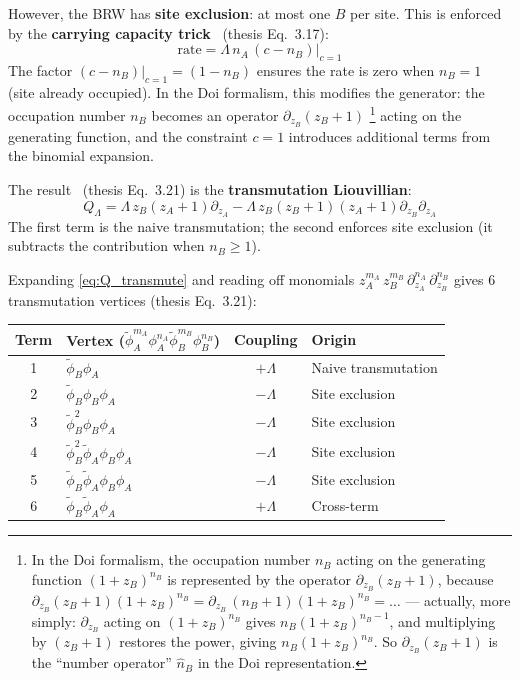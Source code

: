 \documentclass[11pt,a4paper]{article}
\theoremstyle{definition}
\newcommand{\phit}{\tilde{\phi}}
\begin{document}
However, the BRW has \textbf{site exclusion}: at most one $B$ per site.
This is enforced by the \textbf{carrying capacity
trick}~\cite{amarteifio2019} (thesis Eq.~3.17):
\begin{equation}
\text{rate} = \Lambda\, n_A\,(c - n_B)\big|_{c=1}
\label{eq:carrying_capacity}
\end{equation}
The factor $(c - n_B)|_{c=1} = (1 - n_B)$ ensures the rate is zero when
$n_B = 1$ (site already occupied). In the Doi formalism, this modifies
the generator: the occupation number $n_B$ becomes an operator
$\partial_{z_B}(z_B{+}1)$%
\footnote{In the Doi formalism, the occupation number $n_B$ acting on
the generating function $(1{+}z_B)^{n_B}$ is represented by the operator
$\partial_{z_B}(z_B{+}1)$, because
$\partial_{z_B}(z_B{+}1)(1{+}z_B)^{n_B} = \partial_{z_B}\,(n_B{+}1)(1{+}z_B)^{n_B} = \ldots$
--- actually, more simply: $\partial_{z_B}$ acting on $(1{+}z_B)^{n_B}$
gives $n_B(1{+}z_B)^{n_B-1}$, and multiplying by $(z_B{+}1)$ restores
the power, giving $n_B(1{+}z_B)^{n_B}$. So $\partial_{z_B}(z_B{+}1)$
is the ``number operator'' $\hat{n}_B$ in the Doi representation.}
acting on the generating function, and the
constraint $c = 1$ introduces additional terms from the binomial
expansion.

The result~\cite{amarteifio2019} (thesis Eq.~3.21) is the
\textbf{transmutation Liouvillian}:
\begin{equation}
Q_\Lambda = \Lambda\, z_B(z_A{+}1)\partial_{z_A}
- \Lambda\, z_B(z_B{+}1)(z_A{+}1)\partial_{z_B}\partial_{z_A}
\label{eq:Q_transmute}
\end{equation}
The first term is the naive transmutation; the second enforces site
exclusion (it subtracts the contribution when $n_B \geq 1$).

Expanding \eqref{eq:Q_transmute} and reading off monomials
$z_A^{m_A}\, z_B^{m_B}\, \partial_{z_A}^{n_A}\, \partial_{z_B}^{n_B}$
gives 6 transmutation vertices (thesis Eq.~3.21):

\begin{center}
\renewcommand{\arraystretch}{1.2}
\begin{tabular}{clcl}
\toprule
Term & Vertex ($\phit_A^{m_A}\phi_A^{n_A}\phit_B^{m_B}\phi_B^{n_B}$) & Coupling & Origin \\
\midrule
1 & $\phit_B \phi_A$ & $+\Lambda$ & Naive transmutation \\
2 & $\phit_B \phi_B \phi_A$ & $-\Lambda$ & Site exclusion \\
3 & $\phit_B^2 \phi_B \phi_A$ & $-\Lambda$ & Site exclusion \\
4 & $\phit_B^2 \phit_A \phi_B \phi_A$ & $-\Lambda$ & Site exclusion \\
5 & $\phit_B \phit_A \phi_B \phi_A$ & $-\Lambda$ & Site exclusion \\
6 & $\phit_B \phit_A \phi_A$ & $+\Lambda$ & Cross-term \\
\bottomrule
\end{tabular}
\end{center}
\end{document}

